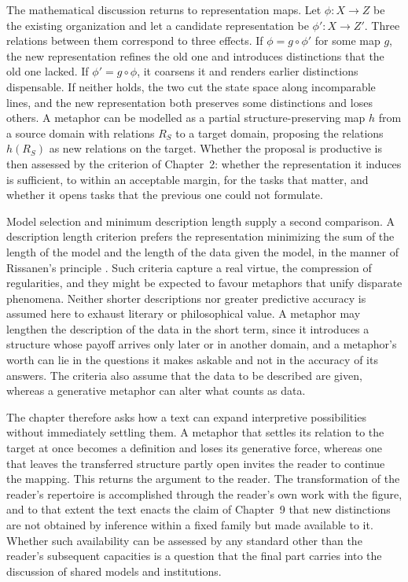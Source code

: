 The mathematical discussion returns to representation maps. Let $\phi:X\to Z$ be the existing organization and let a candidate representation be $\phi':X\to Z'$. Three relations between them correspond to three effects. If $\phi=g\circ\phi'$ for some map $g$, the new representation refines the old one and introduces distinctions that the old one lacked. If $\phi'=g\circ\phi$, it coarsens it and renders earlier distinctions dispensable. If neither holds, the two cut the state space along incomparable lines, and the new representation both preserves some distinctions and loses others. A metaphor can be modelled as a partial structure-preserving map $h$ from a source domain with relations $R_S$ to a target domain, proposing the relations $h(R_S)$ as new relations on the target. Whether the proposal is productive is then assessed by the criterion of Chapter~2: whether the representation it induces is sufficient, to within an acceptable margin, for the tasks that matter, and whether it opens tasks that the previous one could not formulate.

Model selection and minimum description length supply a second comparison. A description length criterion prefers the representation minimizing the sum of the length of the model and the length of the data given the model, in the manner of Rissanen's principle \citep{rissanen1978}. Such criteria capture a real virtue, the compression of regularities, and they might be expected to favour metaphors that unify disparate phenomena. Neither shorter descriptions nor greater predictive accuracy is assumed here to exhaust literary or philosophical value. A metaphor may lengthen the description of the data in the short term, since it introduces a structure whose payoff arrives only later or in another domain, and a metaphor's worth can lie in the questions it makes askable and not in the accuracy of its answers. The criteria also assume that the data to be described are given, whereas a generative metaphor can alter what counts as data.

The chapter therefore asks how a text can expand interpretive possibilities without immediately settling them. A metaphor that settles its relation to the target at once becomes a definition and loses its generative force, whereas one that leaves the transferred structure partly open invites the reader to continue the mapping. This returns the argument to the reader. The transformation of the reader's repertoire is accomplished through the reader's own work with the figure, and to that extent the text enacts the claim of Chapter~9 that new distinctions are not obtained by inference within a fixed family but made available to it. Whether such availability can be assessed by any standard other than the reader's subsequent capacities is a question that the final part carries into the discussion of shared models and institutions.

